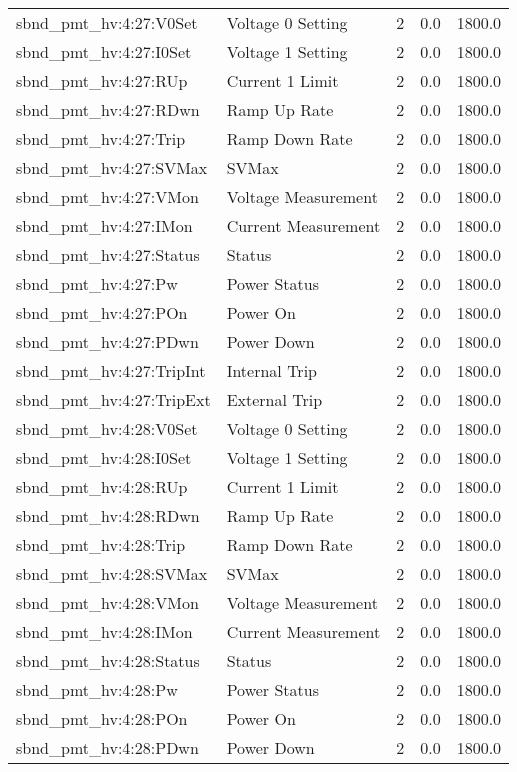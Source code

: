 \begin{center}
\begin{longtable}{l | l l l l }
sbnd\_pmt\_hv:4:27:V0Set & Voltage 0 Setting & 2 & 0.0 & 1800.0\\ 
sbnd\_pmt\_hv:4:27:I0Set & Voltage 1 Setting & 2 & 0.0 & 1800.0\\ 
sbnd\_pmt\_hv:4:27:RUp & Current 1 Limit & 2 & 0.0 & 1800.0\\ 
sbnd\_pmt\_hv:4:27:RDwn & Ramp Up Rate & 2 & 0.0 & 1800.0\\ 
sbnd\_pmt\_hv:4:27:Trip & Ramp Down Rate & 2 & 0.0 & 1800.0\\ 
sbnd\_pmt\_hv:4:27:SVMax & SVMax & 2 & 0.0 & 1800.0\\ 
sbnd\_pmt\_hv:4:27:VMon & Voltage Measurement & 2 & 0.0 & 1800.0\\ 
sbnd\_pmt\_hv:4:27:IMon & Current Measurement & 2 & 0.0 & 1800.0\\ 
sbnd\_pmt\_hv:4:27:Status & Status & 2 & 0.0 & 1800.0\\ 
sbnd\_pmt\_hv:4:27:Pw & Power Status & 2 & 0.0 & 1800.0\\ 
sbnd\_pmt\_hv:4:27:POn & Power On & 2 & 0.0 & 1800.0\\ 
sbnd\_pmt\_hv:4:27:PDwn & Power Down & 2 & 0.0 & 1800.0\\ 
sbnd\_pmt\_hv:4:27:TripInt & Internal Trip & 2 & 0.0 & 1800.0\\ 
sbnd\_pmt\_hv:4:27:TripExt & External Trip & 2 & 0.0 & 1800.0\\ 
sbnd\_pmt\_hv:4:28:V0Set & Voltage 0 Setting & 2 & 0.0 & 1800.0\\ 
sbnd\_pmt\_hv:4:28:I0Set & Voltage 1 Setting & 2 & 0.0 & 1800.0\\ 
sbnd\_pmt\_hv:4:28:RUp & Current 1 Limit & 2 & 0.0 & 1800.0\\ 
sbnd\_pmt\_hv:4:28:RDwn & Ramp Up Rate & 2 & 0.0 & 1800.0\\ 
sbnd\_pmt\_hv:4:28:Trip & Ramp Down Rate & 2 & 0.0 & 1800.0\\ 
sbnd\_pmt\_hv:4:28:SVMax & SVMax & 2 & 0.0 & 1800.0\\ 
sbnd\_pmt\_hv:4:28:VMon & Voltage Measurement & 2 & 0.0 & 1800.0\\ 
sbnd\_pmt\_hv:4:28:IMon & Current Measurement & 2 & 0.0 & 1800.0\\ 
sbnd\_pmt\_hv:4:28:Status & Status & 2 & 0.0 & 1800.0\\ 
sbnd\_pmt\_hv:4:28:Pw & Power Status & 2 & 0.0 & 1800.0\\ 
sbnd\_pmt\_hv:4:28:POn & Power On & 2 & 0.0 & 1800.0\\ 
sbnd\_pmt\_hv:4:28:PDwn & Power Down & 2 & 0.0 & 1800.0\\ 

\end{longtable}
\end{center}
